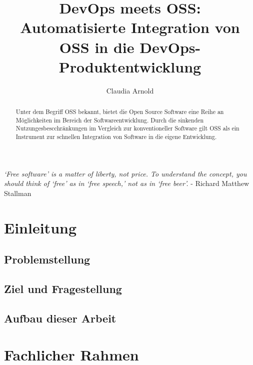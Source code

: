 \documentclass[12pt,titlepage]{article}
\begin{document}
\title{DevOps meets OSS: Automatisierte Integration von OSS in die DevOps-Produktentwicklung\\}
\author{Claudia Arnold}

\maketitle

\begin{abstract}
   Unter dem Begriff OSS bekannt, bietet die Open Source Software eine Reihe an Möglichkeiten im Bereich der Softwareentwicklung. Durch die sinkenden Nutzungesbescchränkungen im Vergleich zur konventioneller Software gilt OSS als ein Instrument zur schnellen Integration von Software in die eigene Entwicklung.  
\end{abstract}

\newpage  
\begin{center}  
    \vspace*{\fill}
    \textit{‘Free software’ is a matter of liberty, not price. To understand the concept, you should think of ‘free’ as in ‘free speech,’ not as in ‘free beer’.}
    \newline
    \newline - Richard Matthew Stallman
    \vspace*{\fill}
\end{center}

\newpage
\section{Einleitung}


\subsection{Problemstellung}


\subsection{Ziel und Fragestellung}


\subsection{Aufbau dieser Arbeit}


\section{Fachlicher Rahmen}

\end{document}
